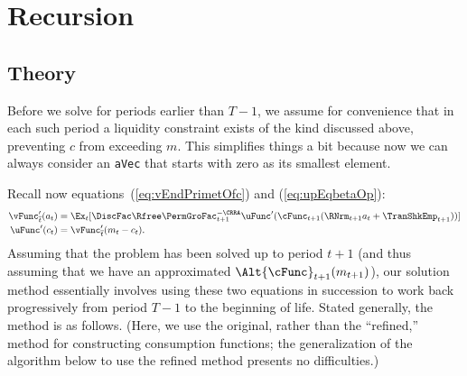 \documentclass[titlepage, headings=optiontotocandhead]{\econtex}
\begin{document}
\hypertarget{Recursions}{}
\section{Recursion}\label{sec:recursion}
\hypertarget{Theory}{}
\subsection{Theory}
Before we solve for periods earlier than $T-1$, we assume for
convenience that in each such period a liquidity constraint exists of
the kind discussed above, preventing ${c}$ from exceeding ${m}$. This
simplifies things a bit because now we can always consider an
\texttt{aVec} that starts with zero as its smallest element.

Recall now equations~(\ref{eq:vEndPrimetOfc}) and (\ref{eq:upEqbetaOp}):
\begin{equation*}\begin{gathered}\begin{aligned}
      \vPEOPt({a}_{t})  & = \Ex_{t}[\DiscFac \Rfree \PermGroFac_{t+1}^{-\CRRA}
      \uFunc^{\prime}(\cFunc_{t+1}(\RNrm_{t+1} {a}_{t}+{\TranShkEmp}_{t+1}))]
      \\\uFunc^{\prime}({c}_{t})   & = \vEOPt^{\prime}({m}_{t}-{c}_{t}).
    \end{aligned}\end{gathered}\end{equation*}
Assuming that the problem has been solved up to period $t+1$ (and thus
assuming that we have an approximated $\Alt{\cFunc}_{t+1}({m}_{t+1})$), our solution method essentially
involves using these two equations in succession to work back
progressively from period $T-1$ to the beginning of life.  Stated
generally, the method is as follows.  (Here, we use the original, rather than the ``refined,'' method for 
constructing consumption functions; the generalization of the algorithm below to use the refined method presents
no difficulties.)
\end{document}

